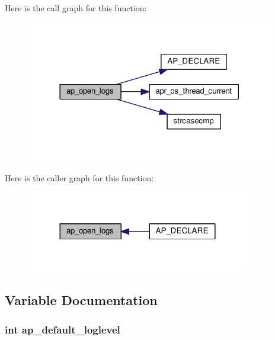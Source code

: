 Here is the call graph for this function\+:
\nopagebreak
\begin{figure}[H]
\begin{center}
\leavevmode
\includegraphics[width=306pt]{group__APACHE__CORE__LOG_gac08123bb03c21f9c22d93856b0063393_cgraph}
\end{center}
\end{figure}




Here is the caller graph for this function\+:
\nopagebreak
\begin{figure}[H]
\begin{center}
\leavevmode
\includegraphics[width=276pt]{group__APACHE__CORE__LOG_gac08123bb03c21f9c22d93856b0063393_icgraph}
\end{center}
\end{figure}




\subsection{Variable Documentation}
\subsubsection[{\texorpdfstring{ap\+\_\+default\+\_\+loglevel}{ap_default_loglevel}}]{ {\bf int} ap\+\_\+default\+\_\+loglevel}\hypertarget{group__APACHE__CORE__LOG_ga3306700b5a77a80df513749df63d1613}{}\label{group__APACHE__CORE__LOG_ga3306700b5a77a80df513749df63d1613}
